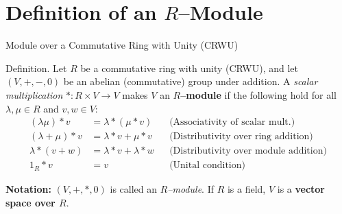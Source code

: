 
\date{17 October 2025}



\begin{frame}
  \cmctitleframe
\end{frame}

\section{Definition of an $R$–Module}

\begin{frame}{Module over a Commutative Ring with Unity (CRWU)}
\begin{block}{Definition.}  
Let $R$ be a commutative ring with unity (CRWU), and let $(V, +, -, 0)$ be an abelian (commutative) group under addition.  
A \emph{scalar multiplication} $*: R\times V \to V$ makes $V$ an \textbf{$R$–module} if the following hold for all $\lambda,\mu\in R$ and $v,w\in V$:
\[
\begin{aligned}
(\lambda\mu)*v &= \lambda*(\mu*v) && \text{(Associativity of scalar mult.)}\\
(\lambda+\mu)*v &= \lambda*v+\mu*v && \text{(Distributivity over ring addition)}\\
\lambda*(v+w) &= \lambda*v+\lambda*w && \text{(Distributivity over module addition)}\\
1_R*v &= v && \text{(Unital condition)}
\end{aligned}
\]

\textbf{Notation:} $(V,+,*,0)$ is called an \emph{$R$–module}.  
If $R$ is a field, $V$ is a \textbf{vector space over $R$}.
    
\end{block}

\end{frame}

